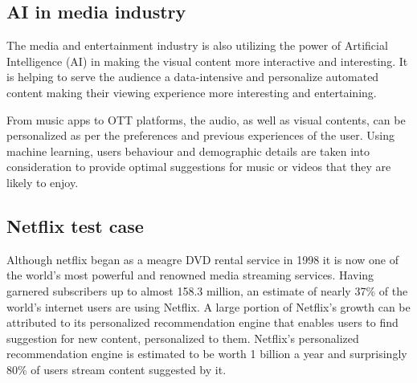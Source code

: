 \subsection{AI in media industry}
The media and entertainment industry is also utilizing the power of Artificial Intelligence (AI) in making the visual content more interactive and interesting. It is helping to serve the audience a data-intensive and personalize automated content making their viewing experience more interesting and entertaining.

From music apps to OTT platforms, the audio, as well as visual contents, can be personalized as per the preferences and previous experiences of the user. Using machine learning, users behaviour and demographic details are taken into consideration to provide optimal suggestions for music or videos that they are likely to enjoy.

\subsection{Netflix test case}
Although netflix began as a meagre DVD rental service in 1998 it is now one of the world’s most powerful and renowned media streaming services. Having garnered subscribers up to almost 158.3 million, an estimate of nearly 37\% of the world’s internet users are using Netflix. A large portion of Netflix's growth can be attributed to its  personalized recommendation engine that enables users to find suggestion for new content, personalized to them.  Netflix's personalized recommendation engine is estimated to be worth  1 billion a year and surprisingly 80\% of users stream content suggested by it.

